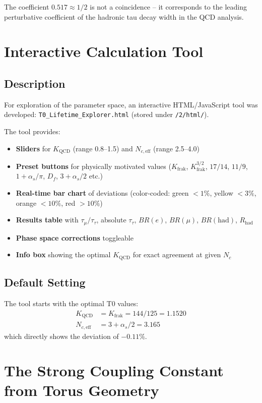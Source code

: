 	The coefficient $0.517 \approx 1/2$ is not a coincidence -- it corresponds to the leading perturbative coefficient of the hadronic tau decay width in the QCD analysis.
	
	
	\section{Interactive Calculation Tool}
	
	\subsection{Description}
	
	For exploration of the parameter space, an interactive HTML/JavaScript tool was developed: \texttt{T0\_Lifetime\_Explorer.html} (stored under \texttt{/2/html/}).
	
	The tool provides:
	\begin{itemize}
		\item \textbf{Sliders} for $K_\text{QCD}$ (range 0.8--1.5) and $N_{c,\text{eff}}$ (range 2.5--4.0)
		\item \textbf{Preset buttons} for physically motivated values ($K_\text{frak}$, $K_\text{frak}^{3/2}$, $17/14$, $11/9$, $1+\alpha_s/\pi$, $D_f$, $3+\alpha_s/2$ etc.)
		\item \textbf{Real-time bar chart} of deviations (color-coded: green $<1\%$, yellow $<3\%$, orange $<10\%$, red $>10\%$)
		\item \textbf{Results table} with $\tau_\mu/\tau_\tau$, absolute $\tau_\tau$, $BR(e)$, $BR(\mu)$, $BR(\text{had})$, $R_\text{had}$
		\item \textbf{Phase space corrections} toggleable
		\item \textbf{Info box} showing the optimal $K_\text{QCD}$ for exact agreement at given $N_c$
	\end{itemize}
	
	\subsection{Default Setting}
	
	The tool starts with the optimal T0 values:
	\begin{align}
		K_\text{QCD} &= K_\text{frak} = 144/125 = 1.1520 \\
		N_{c,\text{eff}} &= 3 + \alpha_s/2 = 3.165
	\end{align}
	which directly shows the deviation of $-0.11\%$.
	
	
	\section{The Strong Coupling Constant from Torus Geometry}
	\label{sec:alpha_s}
	

